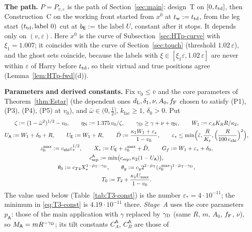 \medskip\noindent\textbf{The path.} $P=P_{v,\varepsilon}$ is the path of Section~\ref{sec:main}: design~T on $[0,t_{\mathrm{td}}]$, then
Construction~C on the working front started from $x^0$ at $t_{\mathrm w}:=t_{\mathrm{td}}$, from the leg start $(t_{\mathrm{td}},\text{label }0)$ cut at
$b_{\mathsf E}:=$ the label $U$, constant after it stops. It depends only on $(v,\varepsilon)$. Here $x^0$ is the curve of
Subsection~\ref{sec:HTp-curve} with $\xi_1=1.007$; it coincides with the curve of Section~\ref{sec:touch} (threshold
$1.02\,\varepsilon$), and the ghost sets coincide, because the labels with $\xi\in[\xi_1\varepsilon,1.02\,\varepsilon]$ are never within
$\varepsilon$ of Harry before $t_{\mathrm{td}}$, so their virtual and true positions agree (Lemma~\ref{lem:HTp-fwd}(d)).

\medskip\noindent\textbf{Parameters and derived constants.} Fix $v_0\le\bar v$ and the core parameters of
Theorem~\ref{thm:Estar} (the dependent ones $d_{\mathrm L},\delta_1,\nu,A_0,f_{\mathrm F}$ chosen to satisfy (P1), (P3), (P4), (P5) at $v_0$), and
$\bar\omega\in(0,\frac12]$, $k_{\mathrm{fac}}\ge1$, $\delta_0>0$. Put
\begin{equation}\label{eq:T3-const}
\begin{gathered}
\zeta:=(1-\bar\omega^2)^{1/2}-v_0,\qquad\eta_{\mathrm N}:=1.375\,v_0/\zeta,\qquad\gamma_{\mathrm D}\ge\gamma+\nu+\eta_{\mathrm N},\qquad
W_1:=c_AK_RR/\kappa_2,\\
U_{\mathsf A}:=W_1+\delta_0+R,\qquad U_{\mathsf E}:=W_1+R,\qquad\bar D:=\frac{\kappa_1W_1+\varepsilon_*}{1-v_0},\qquad
\varepsilon_*\le\min\Bigl(\bar\varepsilon,\frac R{K_\varepsilon},\Bigl(\frac R{100\,c_{\mathrm{zhi}}}\Bigr)^2\Bigr),\\
z_0^{\max}:=c_{\mathrm{zhi}}\varepsilon_*^{1/2},\qquad X_*:=U_{\mathsf E}+z_0^{\max}+\bar D,\qquad G_f:=W_1+\varepsilon_*+\delta_0,\\
c_{\mathrm{sep}}^{\mathsf A}:=\min\bigl(c_{\mathrm{sep}},\kappa_2(1-U_{\mathsf A})\bigr),\\
\theta_0:=c_{T4}X_*^{1-\bar\mu_{\mathrm T}-\gamma_{\mathrm D}},\qquad\theta_y:=c_y2^{2-\bar\mu_{\mathrm T}}(z_0^{\max})^{1-\bar\mu_{\mathrm T}-\gamma_{\mathrm D}},\\
T_0:=T_2+\frac{\kappa_1U_{\max}}{1-v_0} .
\end{gathered}
\end{equation}
The value used below (Table~\ref{tab:T3-const}) is the number $\varepsilon_*=4\cdot10^{-11}$; the minimum in
\eqref{eq:T3-const} is $4.19\cdot10^{-11}$ there.
\emph{Stage~A} uses the core parameters $p_{\mathsf A}$: those of the main application with $\gamma$ replaced by $\gamma_{\mathrm D}$ (same $R$,
$m$, $A_0$, $f_{\mathrm F}$, $\nu$), so $M_{\mathsf A}=mR^{-\gamma_{\mathrm D}}$; its tilt constants $C_A^{\mathsf A}$, $C_B^{\mathsf A}$ are those of

